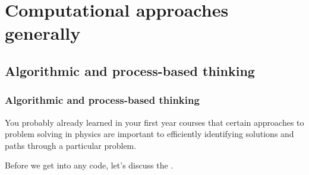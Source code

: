 \documentclass[hyperref={colorlinks=true}]{beamer}
\begin{document}
\section[Computational approaches generally]{Computational approaches generally}

\subsection[Algorithmic and process-based thinking]{Algorithmic and process-based thinking}

\begin{frame}%
  \frametitle{Algorithmic and process-based thinking}
    
  You probably already learned in your first year courses that certain approaches to problem solving in physics are important to efficiently identifying solutions and paths through a particular problem. 
  
  \vspace{1cm}
  
  Before we get into any code, let's discuss the . 
    
\end{frame}

\end{document}
